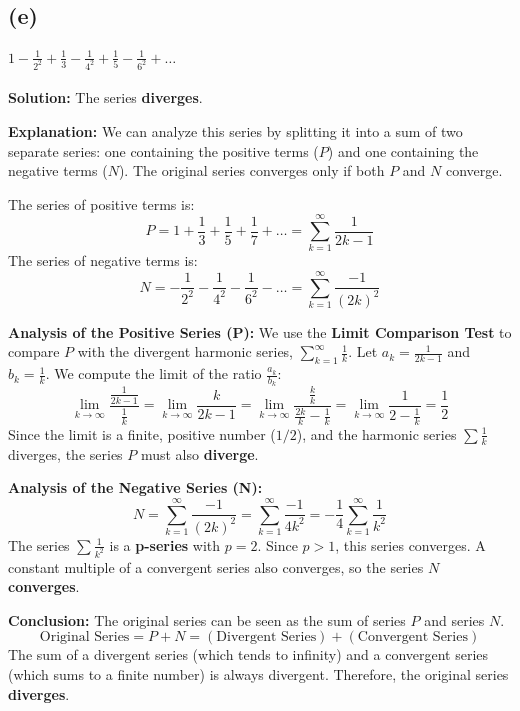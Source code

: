 \documentclass[12pt,a4paper]{article}
\theoremstyle{definition}
\theoremstyle{remark}
\begin{document}

\subsection*{(e)}
\paragraph{$\displaystyle 1 - \frac{1}{2^2} + \frac{1}{3} - \frac{1}{4^2} + \frac{1}{5} - \frac{1}{6^2} + \dots$}
\textbf{Solution:} The series \textbf{diverges}.

\textbf{Explanation:}
We can analyze this series by splitting it into a sum of two separate series: one containing the positive terms ($P$) and one containing the negative terms ($N$). The original series converges only if both $P$ and $N$ converge.

The series of positive terms is:
\[ P = 1 + \frac{1}{3} + \frac{1}{5} + \frac{1}{7} + \dots = \sum_{k=1}^{\infty} \frac{1}{2k-1} \]
The series of negative terms is:
\[ N = -\frac{1}{2^2} - \frac{1}{4^2} - \frac{1}{6^2} - \dots = \sum_{k=1}^{\infty} \frac{-1}{(2k)^2} \]

\textbf{Analysis of the Positive Series (P):}
We use the \textbf{Limit Comparison Test} to compare $P$ with the divergent harmonic series, $\sum_{k=1}^{\infty} \frac{1}{k}$.
Let $a_k = \frac{1}{2k-1}$ and $b_k = \frac{1}{k}$. We compute the limit of the ratio $\frac{a_k}{b_k}$:
\[ \lim_{k\to\infty} \frac{\frac{1}{2k-1}}{\frac{1}{k}} = \lim_{k\to\infty} \frac{k}{2k-1} = \lim_{k\to\infty} \frac{\frac{k}{k}}{\frac{2k}{k}-\frac{1}{k}} = \lim_{k\to\infty} \frac{1}{2 - \frac{1}{k}} = \frac{1}{2} \]
Since the limit is a finite, positive number ($1/2$), and the harmonic series $\sum \frac{1}{k}$ diverges, the series $P$ must also \textbf{diverge}.

\textbf{Analysis of the Negative Series (N):}
\[ N = \sum_{k=1}^{\infty} \frac{-1}{(2k)^2} = \sum_{k=1}^{\infty} \frac{-1}{4k^2} = -\frac{1}{4} \sum_{k=1}^{\infty} \frac{1}{k^2} \]
The series $\sum \frac{1}{k^2}$ is a \textbf{p-series} with $p=2$. Since $p > 1$, this series converges. A constant multiple of a convergent series also converges, so the series $N$ \textbf{converges}.

\textbf{Conclusion:}
The original series can be seen as the sum of series $P$ and series $N$.
\[ \text{Original Series} = P + N = (\text{Divergent Series}) + (\text{Convergent Series}) \]
The sum of a divergent series (which tends to infinity) and a convergent series (which sums to a finite number) is always divergent. Therefore, the original series \textbf{diverges}.
\end{document}
